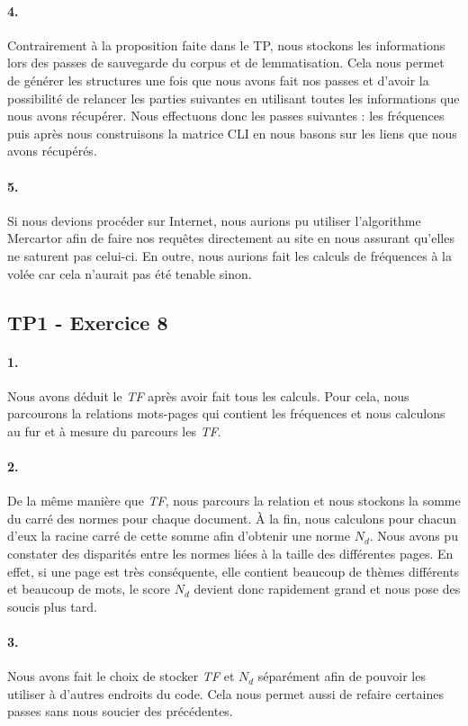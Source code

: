 \documentclass[10pt,a4paper]{article}
\begin{document}
\paragraph{4.}Contrairement à la proposition faite dans le TP, nous stockons les informations lors des passes de sauvegarde du corpus et de lemmatisation. Cela nous permet de générer les structures une fois que nous avons fait nos passes et d'avoir la possibilité de relancer les parties suivantes en utilisant toutes les informations que nous avons récupérer. Nous effectuons donc les passes suivantes : les fréquences puis après nous construisons la matrice CLI en nous basons sur les liens que nous avons récupérés.

\paragraph{5.}Si nous devions procéder sur Internet, nous aurions pu utiliser l'algorithme Mercartor afin de faire nos requêtes directement au site en nous assurant qu'elles ne saturent pas celui-ci. En outre, nous aurions fait les calculs de fréquences à la volée car cela n'aurait pas été tenable sinon.

\subsection{TP1 - Exercice 8}
\paragraph{1.} Nous avons déduit le \textit{TF} après avoir fait tous les calculs. Pour cela, nous parcourons la relations mots-pages qui contient les fréquences et nous calculons au fur et à mesure du parcours les \textit{TF}.	

\paragraph{2.}De la même manière que \textit{TF}, nous parcours la relation et nous stockons la somme du carré des normes pour chaque document. À la fin, nous calculons pour chacun d'eux la racine carré de cette somme afin d'obtenir une norme $N_d$. Nous avons pu constater des disparités entre les normes liées à la taille des différentes pages. En effet, si une page est très conséquente, elle contient beaucoup de thèmes différents et beaucoup de mots, le score $N_d$ devient donc rapidement grand et nous pose des soucis plus tard.

\paragraph{3.} Nous avons fait le choix de stocker \textit{TF} et $N_d$ séparément afin de pouvoir les utiliser à d'autres endroits du code. Cela nous permet aussi de refaire certaines passes sans nous soucier des précédentes.
\end{document}
